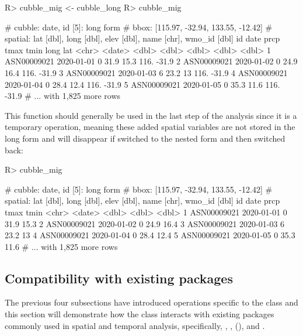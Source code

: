 \documentclass[
]{jss}
\begin{document}
\begin{CodeChunk}
\begin{CodeInput}
R> cubble_mig <- cubble_long %
R> cubble_mig
\end{CodeInput}
\begin{CodeOutput}
# cubble:  date, id [5]: long form
# bbox:    [115.97, -32.94, 133.55, -12.42]
# spatial: lat [dbl], long [dbl], elev [dbl], name [chr], wmo_id [dbl]
  id          date        prcp  tmax  tmin  long   lat
  <chr>       <date>     <dbl> <dbl> <dbl> <dbl> <dbl>
1 ASN00009021 2020-01-01     0  31.9  15.3  116. -31.9
2 ASN00009021 2020-01-02     0  24.9  16.4  116. -31.9
3 ASN00009021 2020-01-03     6  23.2  13    116. -31.9
4 ASN00009021 2020-01-04     0  28.4  12.4  116. -31.9
5 ASN00009021 2020-01-05     0  35.3  11.6  116. -31.9
# ... with 1,825 more rows
\end{CodeOutput}
\end{CodeChunk}

This function should generally be used in the last step of the analysis
since it is a temporary operation, meaning these added spatial variables
are not stored in the long form and will disappear if switched to the
nested form and then switched back:

\begin{CodeChunk}
\begin{CodeInput}
R> cubble_mig %
\end{CodeInput}
\begin{CodeOutput}
# cubble:  date, id [5]: long form
# bbox:    [115.97, -32.94, 133.55, -12.42]
# spatial: lat [dbl], long [dbl], elev [dbl], name [chr], wmo_id [dbl]
  id          date        prcp  tmax  tmin
  <chr>       <date>     <dbl> <dbl> <dbl>
1 ASN00009021 2020-01-01     0  31.9  15.3
2 ASN00009021 2020-01-02     0  24.9  16.4
3 ASN00009021 2020-01-03     6  23.2  13  
4 ASN00009021 2020-01-04     0  28.4  12.4
5 ASN00009021 2020-01-05     0  35.3  11.6
# ... with 1,825 more rows
\end{CodeOutput}
\end{CodeChunk}

\hypertarget{compatibility-with-existing-packages}{%
\subsection{Compatibility with existing
packages}\label{compatibility-with-existing-packages}}

The previous four subsections have introduced operations specific to the
 class and this section will demonstrate how the
 class interacts with existing packages commonly used in
spatial and temporal analysis, specifically, ,
,  (), and .
\end{document}
